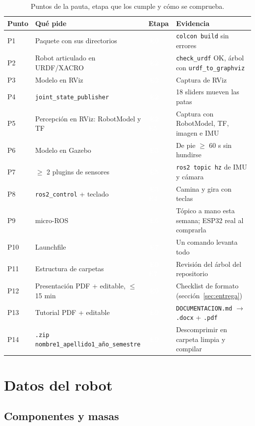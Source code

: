 \documentclass[11pt,a4paper]{article}
\newcommand{\pill}[2]{{\setlength{\fboxsep}{1.6pt}\colorbox{#1}{\textcolor{white}{\footnotesize\bfseries\,#2\,}}}}
\newcommand{\Ez}{\pill{cModelo}{E0}}
\newcommand{\Ed}{\pill{cModelo}{E2}}
\newcommand{\Et}{\pill{cSim}{E3}}
\newcommand{\Ec}{\pill{cControl}{E4}}
\newcommand{\Eci}{\pill{cSens}{E5}}
\newcommand{\Es}{\pill{cMicro}{E6}}
\newcommand{\Esi}{\pill{cInteg}{E7}}
\newcommand{\En}{\pill{cEntrega}{E9}}
\begin{document}
\begin{table}[H]
\centering\small
\begin{tabularx}{\linewidth}{@{}l Y l Y@{}}
\toprule
\textbf{Punto} & \textbf{Qué pide} & \textbf{Etapa} & \textbf{Evidencia}\\
\midrule
P1 & Paquete con sus directorios & \Ez & \texttt{colcon build} sin errores\\
P2 & Robot articulado en URDF/XACRO & \Ed & \texttt{check\_urdf} OK, árbol con \texttt{urdf\_to\_graphviz}\\
P3 & Modelo en RViz & \Ed & Captura de RViz\\
P4 & \texttt{joint\_state\_publisher} & \Ed & 18 sliders mueven las patas\\
P5 & Percepción en RViz: RobotModel y TF & \Ed\ \Eci & Captura con RobotModel, TF, imagen e IMU\\
P6 & Modelo en Gazebo & \Et & De pie $\geq$ 60 s sin hundirse\\
P7 & $\geq$ 2 plugins de sensores & \Eci & \texttt{ros2 topic hz} de IMU y cámara\\
P8 & \texttt{ros2\_control} + teclado & \Et\ \Ec & Camina y gira con teclas\\
P9 & micro-ROS & \Es & Tópico a mano esta semana; ESP32 real al comprarla\\
P10 & Launchfile & \Esi & Un comando levanta todo\\
P11 & Estructura de carpetas & \Ez\ \Esi & Revisión del árbol del repositorio\\
P12 & Presentación PDF + editable, $\leq$ 15 min & \En & Checklist de formato (sección~\ref{sec:entrega})\\
P13 & Tutorial PDF + editable & \En & \texttt{DOCUMENTACION.md} $\rightarrow$ \texttt{.docx} + \texttt{.pdf}\\
P14 & \texttt{.zip} \texttt{nombre1\_apellido1\_año\_semestre} & \En & Descomprimir en carpeta limpia y compilar\\
\bottomrule
\end{tabularx}
\caption{Puntos de la pauta, etapa que los cumple y cómo se comprueba.}
\end{table}

\section{Datos del robot}

\subsection{Componentes y masas}
\end{document}

